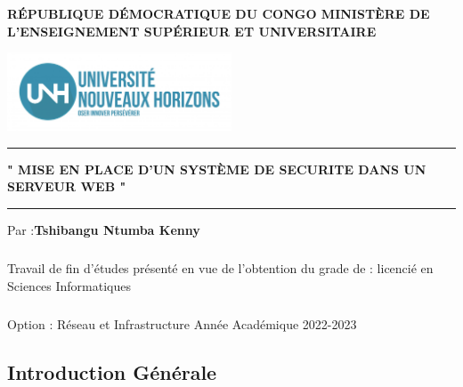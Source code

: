 

	\author{Tshibangu Ntumba Kenny}
	
	\begin{titlepage}
		
		 \centering
		
		\textbf{\Large RÉPUBLIQUE DÉMOCRATIQUE DU CONGO
			MINISTÈRE DE L’ENSEIGNEMENT SUPÉRIEUR ET UNIVERSITAIRE}
		\vspace{1.5cm}
		 
		 \includegraphics[width=0.5\textwidth]{PhotoMemoire/Logo.jpg}
		 \vspace{3.5cm}
		 
		 \hrule
		 \vspace{0.6cm}
		 \textbf{\Large "  MISE EN PLACE D'UN SYSTÈME DE SECURITE DANS UN SERVEUR WEB "}
		 \vspace{0.6cm}
		 \hrule
		 \vspace{2.5cm}
		 
		  \large Par :\textbf{Tshibangu Ntumba Kenny} 
		  
		  \paragraph{ } Travail de fin d’études présenté en vue de l’obtention
		  du grade de : licencié en Sciences Informatiques
		\paragraph{ } \Large{ Option : Réseau et Infrastructure}
		 \vfill
		 {\LARGE Année Académique 2022-2023}
		 \centering
	\end{titlepage}
\begin{center}
\tableofcontents
\pagebreak
\end{center}
\begin{center}
	\listoffigures
	\pagebreak
\end{center}
	    \begin{abstract}
	    	 
	    \end{abstract}
    
	\begin{Huge}
		\chapter{ Introduction Générale}
 
	\end{Huge}
 
